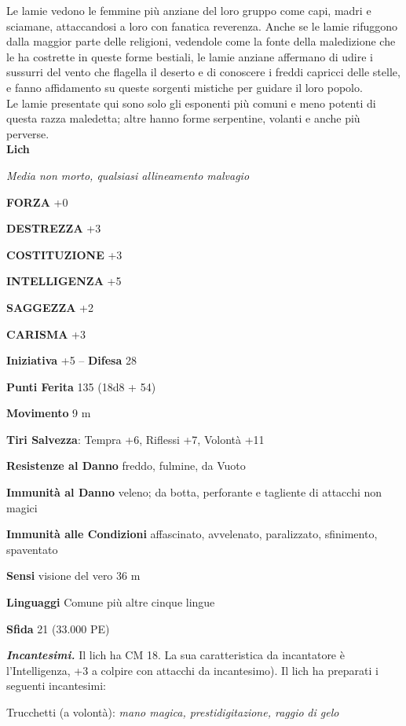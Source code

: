\begin{multicols}{2}
Le lamie vedono le femmine più anziane del loro gruppo come capi, madri e sciamane, attaccandosi a loro con fanatica reverenza. Anche se le lamie rifuggono dalla maggior parte delle religioni, vedendole come la fonte della maledizione che le ha costrette in queste forme bestiali, le lamie anziane affermano di udire i sussurri del vento che flagella il deserto e di conoscere i freddi capricci delle stelle, e fanno affidamento su queste sorgenti mistiche per guidare il loro popolo.\\

Le lamie presentate qui sono solo gli esponenti più comuni e meno potenti di questa razza maledetta; altre hanno forme serpentine, volanti e anche più perverse.\\


\medskip{}\textbf{Lich}

\emph{Media non morto, qualsiasi allineamento malvagio}

\textbf{FORZA} +0

\textbf{DESTREZZA} +3

\textbf{COSTITUZIONE} +3

\textbf{INTELLIGENZA} +5

\textbf{SAGGEZZA} +2

\textbf{CARISMA} +3

\textbf{Iniziativa} +5 -- \textbf{Difesa} 28

\textbf{Punti Ferita} 135 (18d8 + 54)

\textbf{Movimento} 9 m

\textbf{Tiri Salvezza}: Tempra +6, Riflessi +7, Volontà +11

\textbf{Resistenze al Danno} freddo, fulmine, da Vuoto

\textbf{Immunità al Danno} veleno; da botta, perforante e tagliente di attacchi non magici

\textbf{Immunità alle Condizioni} affascinato, avvelenato, paralizzato, sfinimento, spaventato

\textbf{Sensi} visione del vero 36 m

\textbf{Linguaggi} Comune più altre cinque lingue

\textbf{Sfida} 21 (33.000 PE)

\emph{\textbf{Incantesimi.}} Il lich ha CM 18. La sua caratteristica da incantatore è l'Intelligenza, +3 a colpire con attacchi da incantesimo). Il lich ha preparati i seguenti incantesimi:

Trucchetti (a volontà): \emph{mano magica, prestidigitazione, raggio} \emph{di gelo}


\end{multicols}
